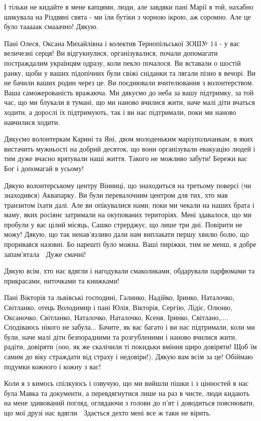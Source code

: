 І тільки не кидайте в мене капцями, люди, але завдяки пані Марії я той, нахабно
шикувала на Різдвяні свята - ми їли бутіки з чорною ікрою, аж соромно. Але це
було тааааак смааачно! Дякую.

Пані Олеся, Оксана Михайлівна і колектив Тернопільської ЗОШ№ 14 - у вас
величезні серця! Ви відгукнулися, організувалися, почали допомагати
постраждалим українцям одразу, коли пекло почалося. Ви вставали о шостій ранку,
щоби у ваших підопічних були свіжі сніданки та лягали пізно в вечорі. Ви не
бачили ваших родин через це. Ви поєднювали вчителювання з волонтерством. Ваша
саможерованість вражаюча. Ми дякуємо до неба за вашу підтримку, за той час, що
ми блукали в тумані, що ми наново вчилися жити, наче малі діти вчаться ходити,
а дорослі їх підтримують, так і ви нас підтримали, поки ми наново навчилися
ходити.

Дякуємо волонтеркам Карині та Яні, двом молоденьким маріупольчанкам, в яких
вистачить мужньості на добрий десяток, що вони організували евакуацію людей і
тим дуже вчасно врятували наші життя. Такого не можливо забути! Бережи вас Бог
і допомагай в усьому!

Дякую волонтерському центру Вінниці, що знаходиться на третьому поверсі (чи
знаходився) Аквапарку. Ви були перевалочним центром для тих, хто мав транзитом
їхати далі. Але ви опікувалися нами, поки ми чекали на наших брата і маму, яких
росіянє затримали на окупованих територіях. Мені здавалося, що ми пробули у вас
цілий місяць, Сашко стрерджує, що лише три дні. Повірити не можу! Дякую, що так
ненав’язливо дали нам виплакати першу хвилю болю, що проривався назовні. Бо
нарешті було можна. Ваші пиріжки, тим не менш, я добре запам’ятала 🙂 Дуже
смачні! 🙂

Дякую всім, хто нас вдягли і нагодували смаколиками, обдарували парфюмами та
прикрасами, ниточками та книжками! 

Пані Вікторія та львівські господині, Галинко, Надійко, Іринко, Наталочко,
Світланко, отець Володимир і пані Юлія, Вікторія, Сергію, Лідіє, Олюню,
Оксаночко, Світланко, Наталочко, Наталочко, Ксеня, Іринко, Світлано,....
Сподіваюсь нікого не забула... Бачите, як вас багато і ви нас підтримали, коли ми
були, наче малі діти безпорадними та розгубленими і наново вчилися жити,
радіти, довіряти (ооо, як же скалічили ті покидьки вміння щиро довіряти! Щоб їм
самим до віку страждати від страху і недовіри!). Дякую вам всім за це! Обіймаю
подумки кожного і кожну з вас!

Коли я з кимось спілкуюсь і озвучую, що ми вийшли пішки і з цінностей в нас
була Мавка та документи, а перевдягнутися лише на раз в чисте, люди кидають на
мене здивований погляд, оглядаючи з голови до п’ят і доводиться пояснювати, що
мої друзі нас вдягли 🙂 Здається дехто мені все ж таки не вірить. 🙂

